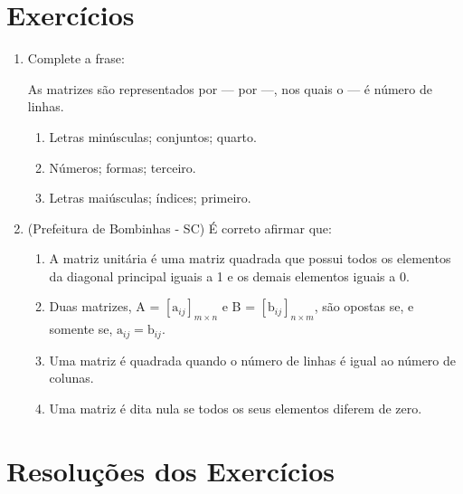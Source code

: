 \documentclass[a4paper,12pt]{article}
\begin{document}
\newpage

\section{Exercícios}

 \begin{enumerate}
 
\item Complete a frase:

As matrizes são representados por --- por ---, nos quais o --- é número de linhas.

    \begin{enumerate}
    
        \item Letras minúsculas; conjuntos; quarto.
        
        \item Números; formas; terceiro.
        
        \item Letras maiúsculas; índices; primeiro.
        
    \end{enumerate}


\item (Prefeitura de Bombinhas - SC) É correto afirmar que:

    \begin{enumerate}

    \item A matriz unitária é uma matriz quadrada que possui todos os elementos da diagonal principal iguais a 1 e os demais elementos iguais a 0.
    
    \item Duas matrizes, A = $ [\text{a}_{ij}]_{m \times n} $ e B = $ [\text{b}_{ij}]_{n \times m} $, são opostas se, e somente se, $ \text{a}_{ij} = \text{b}_{ij}$.
    
    \item Uma matriz é quadrada quando o número de linhas é igual ao número de colunas.
    
    \item Uma matriz é dita nula se todos os seus elementos diferem de zero.

    \end{enumerate}

 \end{enumerate}
 
\section{Resoluções dos Exercícios}
 
\end{document}

